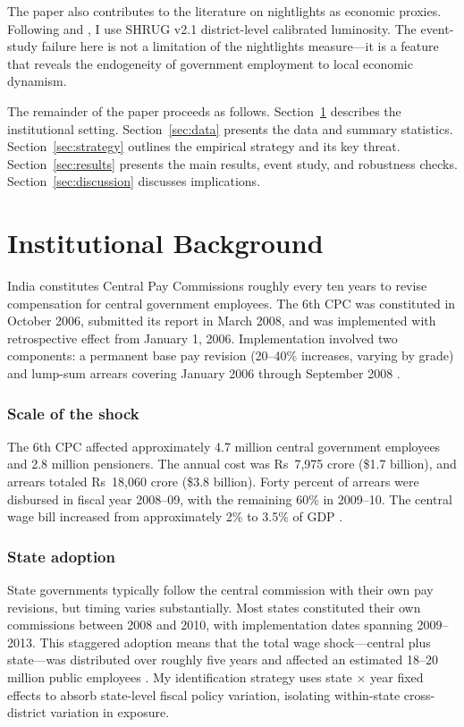 \documentclass[12pt]{article}
\begin{document}
The paper also contributes to the literature on nightlights as economic proxies. Following \citet{Henderson2012} and \citet{Asher2021}, I use SHRUG v2.1 district-level calibrated luminosity. The event-study failure here is not a limitation of the nightlights measure---it is a feature that reveals the endogeneity of government employment to local economic dynamism.

The remainder of the paper proceeds as follows. Section~\ref{sec:background} describes the institutional setting. Section~\ref{sec:data} presents the data and summary statistics. Section~\ref{sec:strategy} outlines the empirical strategy and its key threat. Section~\ref{sec:results} presents the main results, event study, and robustness checks. Section~\ref{sec:discussion} discusses implications.

\section{Institutional Background}
\label{sec:background}

India constitutes Central Pay Commissions roughly every ten years to revise compensation for central government employees. The 6th CPC was constituted in October 2006, submitted its report in March 2008, and was implemented with retrospective effect from January 1, 2006. Implementation involved two components: a permanent base pay revision (20--40\% increases, varying by grade) and lump-sum arrears covering January 2006 through September 2008 \citep{SixthCPC2008}.

\subsubsection*{Scale of the shock} The 6th CPC affected approximately 4.7 million central government employees and 2.8 million pensioners. The annual cost was Rs~7,975 crore (\$1.7 billion), and arrears totaled Rs~18,060 crore (\$3.8 billion). Forty percent of arrears were disbursed in fiscal year 2008--09, with the remaining 60\% in 2009--10. The central wage bill increased from approximately 2\% to 3.5\% of GDP \citep{Chakraborty2010}.

\subsubsection*{State adoption} State governments typically follow the central commission with their own pay revisions, but timing varies substantially. Most states constituted their own commissions between 2008 and 2010, with implementation dates spanning 2009--2013. This staggered adoption means that the total wage shock---central plus state---was distributed over roughly five years and affected an estimated 18--20 million public employees \citep{Rangarajan2011}. My identification strategy uses state $\times$ year fixed effects to absorb state-level fiscal policy variation, isolating within-state cross-district variation in exposure.
\end{document}
